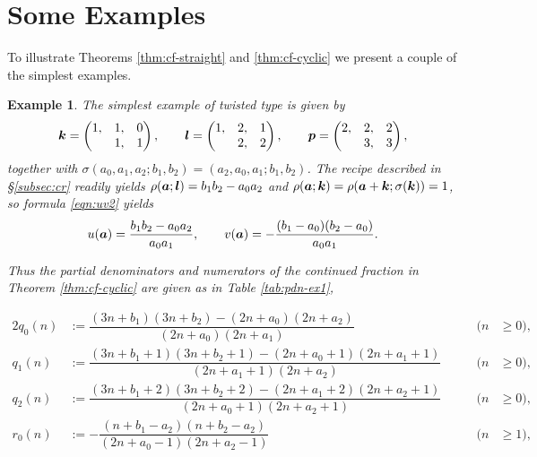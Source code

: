 \documentclass[a4paper,12pt]{article}
\theoremstyle{plain}
\newtheorem{example}[theorem]{Example}
\def\ba{\mbox{\boldmath $a$}}
\def\bk{\mbox{\boldmath $k$}}
\def\bl{\mbox{\boldmath $l$}}
\def\bp{\mbox{\boldmath $p$}}
\begin{document}
\section{Some Examples} \label{sec:example} 
To illustrate Theorems \ref{thm:cf-straight} and \ref{thm:cf-cyclic} we 
present a couple of the simplest examples.          
\begin{example} \label{ex:1} 
The simplest example of twisted type is given by  
\[
\bk = \begin{pmatrix} 1, & 1, & 0 \\ & 1, & 1 \end{pmatrix}, \qquad 
\bl = \begin{pmatrix} 1, & 2, & 1 \\ & 2, & 2 \end{pmatrix}, \qquad 
\bp = \begin{pmatrix} 2, & 2, & 2 \\ & 3, & 3 \end{pmatrix},   
\]
together with $\sigma(a_0, a_1, a_2; b_1, b_2) = (a_2, a_0, a_1; b_1, b_2)$.  
The recipe described in \S \ref{subsec:cr} readily yields   
$\rho(\ba; \bl) = b_1 b_2 - a_0 a_2$ and $\rho(\ba; \bk) = 
\rho(\ba+\bk; \sigma(\bk))  = 1$, so formula \eqref{eqn:uv2} yields   
\[
u(\ba) = \dfrac{ b_1 b_2 - a_0 a_2}{a_0 a_1}, \qquad 
v(\ba) = -\dfrac{(b_1-a_0)(b_2-a_0)}{a_0 a_1}.      
\] 
\par
Thus the partial denominators and numerators of the continued fraction in 
Theorem \ref{thm:cf-cyclic} are given as in Table \ref{tab:pdn-ex1}, 
\begin{table}[t]
\begin{alignat*}{2} 
q_0(n) &:= \dfrac{(3 n+b_1)(3 n+b_2)-(2 n + a_0)(2 n+ a_2)}{(2 n + a_0)(2 n + a_1)} 
\qquad & (n &\ge 0),  \\[2mm]
q_1(n) &:= \dfrac{(3 n + b_1 +1)(3 n + b_2+1)-(2 n+a_0+1)(2 n+ a_1+1)}{(2 n + a_1+1)(2 n + a_2)} 
\qquad & (n &\ge 0),  \\[2mm]
q_2(n) &:= 
\dfrac{(3 n+b_1+2)(3 n+ b_2+2)-(2 n+ a_1+2)(2 n+ a_2+1)}{(2 n+a_0+1)(2 n + a_2 + 1)} 
\qquad & (n &\ge 0),  \\[2mm] 
r_0(n) &:= - \dfrac{(n+b_1-a_2)(n+b_2-a_2)}{(2 n+a_0-1)(2 n+a_2-1)} 
\qquad & (n &\ge 1), \\[2mm]

\end{alignat*}
\end{table}
\end{example}
\end{document}
